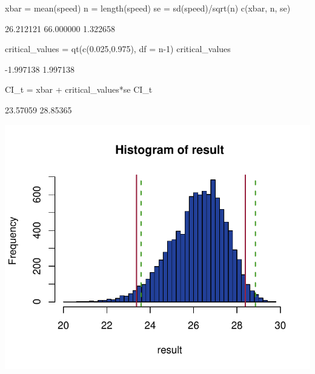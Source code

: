 \documentclass[a4paper]{article}
\begin{document}
\begin{Schunk}
\begin{Sinput}
xbar = mean(speed)
n = length(speed)
se = sd(speed)/sqrt(n)
c(xbar, n, se)
\end{Sinput}
\begin{Soutput}
[1] 26.212121 66.000000  1.322658
\end{Soutput}
\begin{Sinput}
critical_values = qt(c(0.025,0.975), 
                     df = n-1)
critical_values
\end{Sinput}
\begin{Soutput}
[1] -1.997138  1.997138
\end{Soutput}
\begin{Sinput}
CI_t = xbar + critical_values*se
CI_t
\end{Sinput}
\begin{Soutput}
[1] 23.57059 28.85365
\end{Soutput}


{\centering \includegraphics[width=\maxwidth]{figure/listings-unnamed-chunk-169-1} 

}

\end{Schunk}
\end{document}
